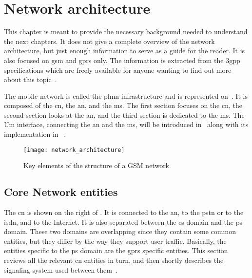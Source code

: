 \chapter{Network architecture}
\label{chap:network_architecture}

  This chapter is meant to provide the necessary background needed to
  understand the next chapters. It does not give a complete overview of
  the network architecture, but just enough information to serve as a
  guide for the reader. It is also focused on \gls{gsm} and \gls{gprs}
  only. The information is extracted from the \gls{3gpp} specifications
  which are freely available for anyone wanting to find out more about
  this topic~\cite{3gpp_specifications_????}.

  The mobile network is called the \gls{plmn} infrastructure and is
  represented on~. It is composed of the
  \gls{cn}, the \gls{an}, and the \gls{ms}. The first section focuses on
  the \gls{cn}, the second section looks at the \gls{an}, and the third
  section is dedicated to the \gls{ms}. The Um interface, connecting the
  \gls{an} and the \gls{ms}, will be introduced
  in~ along with its
  implementation in ~\cite{etsi_gsm_2001,3gpp_ts_2015}.

  \begin{figure}[h]
    \centering
    \texttt{[image: network\_architecture]}
    \caption{Key elements of the structure of a GSM
            network~\cite{wikimedia_commons_key_2009}}
    \label{fig:network_architecture}
  \end{figure}

  \section{Core Network entities}

    The \gls{cn} is shown on the right of
    . It is connected to the \gls{an}, to
    the \gls{pstn} or to the \gls{isdn}, and to the Internet. It is also
    separated between the \gls{cs} domain and the \gls{ps} domain. These
    two domains are overlapping since they contain some common entities,
    but they differ by the way they support user traffic. Basically, the
    entities specific to the \gls{ps} domain are the \gls{gprs} specific
    entities. This section reviews all the relevant \gls{cn} entities in
    turn, and then shortly describes the signaling system used between
    them~\cite{3gpp_ts_2015}.


